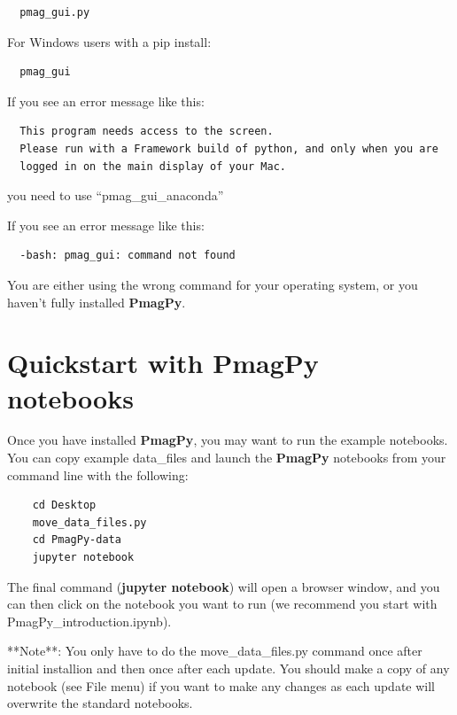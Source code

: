 \documentclass[11pt]{book}
\begin{document}
{\begin{verbatim}
  pmag_gui.py
\end{verbatim}

For Windows users with a pip install:

\begin{verbatim}
  pmag_gui
\end{verbatim}


If you see an error message like this:

\begin{verbatim}
  This program needs access to the screen.
  Please run with a Framework build of python, and only when you are
  logged in on the main display of your Mac.
\end{verbatim}

you need to use ``pmag\_gui\_anaconda''

If you see an error message like this:

\begin{verbatim}
  -bash: pmag_gui: command not found
\end{verbatim}

You are either using the wrong command for your operating system, or you haven't fully installed {\bf PmagPy}.



\section{Quickstart with PmagPy notebooks}

Once you have installed {\bf PmagPy}, you may want to run the example notebooks.  You can copy example data\_files and launch the {\bf PmagPy} notebooks from your command line with the following:

\begin{verbatim}
    cd Desktop
    move_data_files.py
    cd PmagPy-data
    jupyter notebook
\end{verbatim}

The final command ({\bf jupyter notebook}) will open a browser window, and you can then click on the notebook you want to run (we recommend you start with PmagPy\_introduction.ipynb).

**Note**: You only have to do the move\_data\_files.py command once after initial installion and then once after each update.   You should make a copy of any notebook (see File menu) if you want to make any changes as each update will overwrite the standard notebooks.

}
\end{document}

